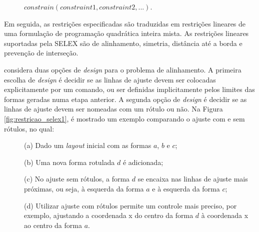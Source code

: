 \vspace{0.5cm}

\begin{description}
    \item[] \qquad \qquad $constrain(constraint1, constraint2, ...)$.
\end{description}

\vspace{0.5cm}

Em seguida, as restrições especificadas são traduzidas em restrições lineares de uma formulação de programação quadrática inteira mista. As restrições lineares suportadas pela \gls{SELEX} são de alinhamento, simetria, distância até a borda e prevenção de interseção.

 considera duas opções de \textit{design} para o problema de alinhamento. A primeira escolha de \textit{design} é decidir se as linhas de ajuste devem ser colocadas explicitamente por um comando, ou ser definidas implicitamente pelos limites das formas geradas numa etapa anterior. A segunda opção de \textit{design} é decidir se as linhas de ajuste devem ser nomeadas com um rótulo ou não. Na Figura \ref{fig:restricao_selex1}, é mostrado um exemplo comparando o ajuste com e sem rótulos, no qual: 

\begin{description}
    \item[] \; (a) Dado um \textit{layout} inicial com as formas $a$, $b$ e $c$;
    
    \item[] \; (b) Uma nova forma rotulada $d$ é adicionada;
    
    \item[] \; (c) No ajuste sem rótulos, a forma $d$ se encaixa nas linhas de ajuste mais próximas, ou seja, à esquerda da forma $a$ e à esquerda da forma $c$;
    
    \item[] \; (d) Utilizar ajuste com rótulos permite um controle mais preciso, por exemplo, ajustando a coordenada x do centro da forma $d$ à coordenada x ao centro da forma $a$.
\end{description}

\begin{figure}[h!]
	\centering
	\captionsetup{width=15cm}
	{}	
\end{figure}

